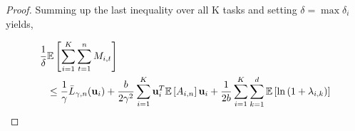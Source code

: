 \begin{proof}
Summing up the last inequality over all K tasks and setting $\delta = \max{\delta_i}$ yields,

\begin{equation*}
  \begin{split}
   \frac{1}{\delta}&\mathbb{E}\left[{\sum_{i=1}^{K}\sum_{t=1}^{n}{M_{i,t}}}\right] \\
   &\le \frac{1}{\gamma}{\bar L}_{\gamma,n}(\mathbf{u}_{i})
+ \frac{b}{2\gamma^2}\sum_{i=1}^{K}\mathbf{u}_i^T\mathbb{E}\left[{A_{i,n}}\right]\mathbf{u}_i+ \frac{1}{2b}\sum_{i=1}^{K}\sum_{k=1}^{d}\mathbb{E}\left[{\ln\left({1+\lambda_{i,k}}\right)}\right]
\end{split}
\end{equation*} 
\end{proof}









